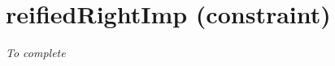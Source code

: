 \section{reifiedRightImp (constraint)}\label{reifiedrightimp:reifiedrightimpconstraint}\hypertarget{reifiedrightimp:reifiedrightimpconstraint}{}
\emph{To complete}
